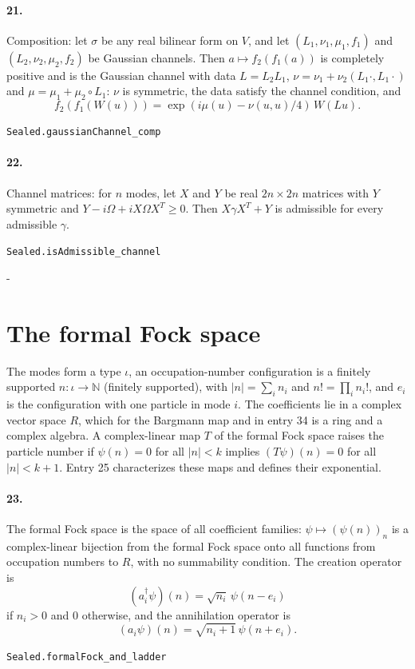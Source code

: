 \documentclass[11pt]{article}
\makeatletter
\newcommand{\keepspace}[1]{\par\penalty-100\begingroup\setlength{\dimen@}{#1}\dimen@ii\pagegoal\advance\dimen@ii-\pagetotal\ifdim\dimen@>\dimen@ii\ifdim\dimen@ii>\z@\vfil\fi\break\fi\endgroup}
\makeatother
\begin{document}
\paragraph{21.} Composition: let $\sigma$ be any real bilinear form on $V$, and let $(L_1, \nu_1, \mu_1, f_1)$ and $(L_2, \nu_2, \mu_2, f_2)$ be Gaussian channels. Then $a \mapsto f_2(f_1(a))$ is completely positive and is the Gaussian channel with data $L = L_2 L_1$, $\nu = \nu_1 + \nu_2(L_1\cdot, L_1\cdot)$ and $\mu = \mu_1 + \mu_2 \circ L_1$: $\nu$ is symmetric, the data satisfy the channel condition, and \[f_2(f_1(W(u))) = \exp(i\mu(u) - \nu(u, u)/4)\, W(Lu).\]\par{\footnotesize\texttt{Sealed.gaussianChannel\_comp}}

\paragraph{22.} Channel matrices: for $n$ modes, let $X$ and $Y$ be real $2n \times 2n$ matrices with $Y$ symmetric and $Y - i\Omega + iX\Omega X^T \ge 0$. Then $X \gamma X^T + Y$ is admissible for every admissible $\gamma$.\par{\footnotesize\texttt{Sealed.isAdmissible\_channel}}

\keepspace{14\baselineskip}\section*{The formal Fock space}
The modes form a type $\iota$, an occupation-number configuration is a finitely supported $n : \iota \to \mathbb N$ (finitely supported), with $|n| = \sum_i n_i$ and $n! = \prod_i n_i!$, and $e_i$ is the configuration with one particle in mode $i$. The coefficients lie in a complex vector space $R$, which for the Bargmann map and in entry 34 is a ring and a complex algebra. A complex-linear map $T$ of the formal Fock space raises the particle number if $\psi(n) = 0$ for all $|n| < k$ implies $(T\psi)(n) = 0$ for all $|n| < k + 1$. Entry 25 characterizes these maps and defines their exponential.

\paragraph{23.} The formal Fock space is the space of all coefficient families: $\psi \mapsto (\psi(n))_n$ is a complex-linear bijection from the formal Fock space onto all functions from occupation numbers to $R$, with no summability condition. The creation operator is \[(a_i^\dagger \psi)(n) = \sqrt{n_i}\, \psi(n - e_i)\] if $n_i > 0$ and $0$ otherwise, and the annihilation operator is \[(a_i \psi)(n) = \sqrt{n_i + 1}\, \psi(n + e_i).\]\par{\footnotesize\texttt{Sealed.formalFock\_and\_ladder}}
\end{document}
